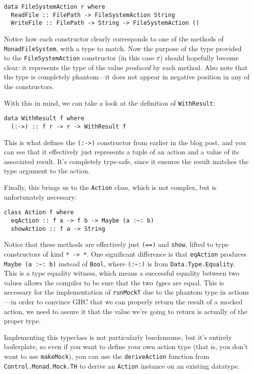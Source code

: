 \begin{verbatim}
data FileSystemAction r where
  ReadFile :: FilePath -> FileSystemAction String
  WriteFile :: FilePath -> String -> FileSystemAction ()
\end{verbatim}
Notice how each constructor clearly corresponds to one of the methods of
\texttt{MonadFileSystem}, with a type to match. Now the purpose of the
type provided to the \texttt{FileSystemAction} constructor (in this case
\texttt{r}) should hopefully become clear: it represents the type of the
value \emph{produced} by each method. Also note that the type is
completely phantom---it does not appear in negative position in any of
the constructors.

With this in mind, we can take a look at the definition of
\texttt{WithResult}:

\begin{verbatim}
data WithResult f where
  (:->) :: f r -> r -> WithResult f
\end{verbatim}
This is what defines the \texttt{(:-\textgreater{})} constructor from
earlier in the blog post, and you can see that it effectively just
represents a tuple of an action and a value of its associated result.
It's completely type-safe, since it ensures the result matches the type
argument to the action.

Finally, this brings us to the \texttt{Action} class, which is not
complex, but is unfortunately necessary:

\begin{verbatim}
class Action f where
  eqAction :: f a -> f b -> Maybe (a :~: b)
  showAction :: f a -> String
\end{verbatim}
Notice that these methods are effectively just \texttt{(==)} and
\texttt{show}, lifted to type constructors of kind
\texttt{*\ -\textgreater{}\ *}. One significant difference is that
\texttt{eqAction} produces \texttt{Maybe\ (a\ :\textasciitilde{}:\ b)}
instead of \texttt{Bool}, where \texttt{(:\textasciitilde{}:)} is from
\texttt{Data.Type.Equality}. This is a type equality witness, which
means a successful equality between two values allows the compiler to be
sure that the two \emph{types} are equal. This is necessary for the
implementation of \texttt{runMockT} due to the phantom type in
actions---in order to convince GHC that we can properly return the
result of a mocked action, we need to assure it that the value we're
going to return is actually of the proper type.

Implementing this typeclass is not particularly burdensome, but it's
entirely boilerplate, so even if you want to define your own action type
(that is, you don't want to use \texttt{makeMock}), you can use the
\texttt{deriveAction} function from \texttt{Control.Monad.Mock.TH} to
derive an \texttt{Action} instance on an existing datatype.

